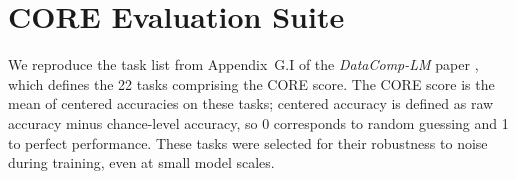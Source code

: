 \documentclass{article}
\begin{document}
\newpage
\appendix
\section{CORE Evaluation Suite}
\label{app:core}

We reproduce the task list from Appendix~G.I of the \textit{DataComp-LM} paper
\parencite{li2025datacomplmsearchgenerationtraining}, which defines the 22 tasks comprising the
CORE score.
The CORE score is the mean of centered accuracies on these tasks; centered accuracy is defined as
raw accuracy minus chance-level accuracy, so 0 corresponds to random guessing and 1 to perfect
performance.
These tasks were selected for their robustness to noise during training, even at small model
scales.
\end{document}
